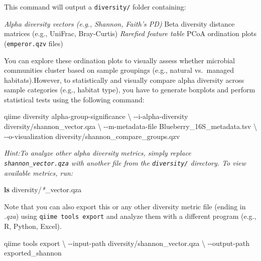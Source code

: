 \documentclass[
]{book}
\newenvironment{Shaded}{\begin{snugshade}}{\end{snugshade}}
\newcommand{\AttributeTok}[1]{\textcolor[rgb]{0.13,0.29,0.53}{#1}}
\newcommand{\DataTypeTok}[1]{\textcolor[rgb]{0.13,0.29,0.53}{#1}}
\newcommand{\ExtensionTok}[1]{#1}
\newcommand{\FunctionTok}[1]{\textcolor[rgb]{0.13,0.29,0.53}{\textbf{#1}}}
\newcommand{\NormalTok}[1]{#1}
\newcommand{\PreprocessorTok}[1]{\textcolor[rgb]{0.56,0.35,0.01}{\textit{#1}}}
\begin{document}
This command will output a \texttt{diversity/} folder containing:

\emph{Alpha diversity vectors (e.g., Shannon, Faith's PD)
}Beta diversity distance matrices (e.g., UniFrac, Bray-Curtis)
\emph{Rarefied feature table
}PCoA ordination plots (\texttt{emperor.qzv} files)

You can explore these ordination plots to visually assess whether microbial communities cluster based on sample groupings (e.g., natural vs.~managed habitats).However, to statistically and visually compare alpha diversity across sample categories (e.g., habitat type), you have to generate boxplots and perform statistical tests using the following command:

\begin{Shaded}
\begin{Highlighting}[]
\ExtensionTok{qiime}\NormalTok{ diversity alpha{-}group{-}significance }\DataTypeTok{\textbackslash{}}
  \AttributeTok{{-}{-}i{-}alpha{-}diversity}\NormalTok{ diversity/shannon\_vector.qza }\DataTypeTok{\textbackslash{}}
  \AttributeTok{{-}{-}m{-}metadata{-}file}\NormalTok{ Blueberry\_16S\_metadata.tsv }\DataTypeTok{\textbackslash{}}
  \AttributeTok{{-}{-}o{-}visualization}\NormalTok{ diversity/shannon\_compare\_groups.qzv}
\end{Highlighting}
\end{Shaded}

\emph{Hint:To analyze other alpha diversity metrics, simply replace \texttt{shannon\_vector.qza} with another file from the \texttt{diversity/} directory. To view available metrics, run:}

\begin{Shaded}
\begin{Highlighting}[]
\FunctionTok{ls}\NormalTok{ diversity/}\PreprocessorTok{*}\NormalTok{\_vector.qza}
\end{Highlighting}
\end{Shaded}

Note that you can also export this or any other diversity metric file (ending in \emph{.qza}) using \texttt{qiime\ tools\ export} and analyze them with a different program (e.g., R, Python, Excel).

\begin{Shaded}
\begin{Highlighting}[]
\ExtensionTok{qiime}\NormalTok{ tools export }\DataTypeTok{\textbackslash{}}
  \AttributeTok{{-}{-}input{-}path}\NormalTok{ diversity/shannon\_vector.qza }\DataTypeTok{\textbackslash{}}
  \AttributeTok{{-}{-}output{-}path}\NormalTok{ exported\_shannon}
\end{Highlighting}
\end{Shaded}
\end{document}

